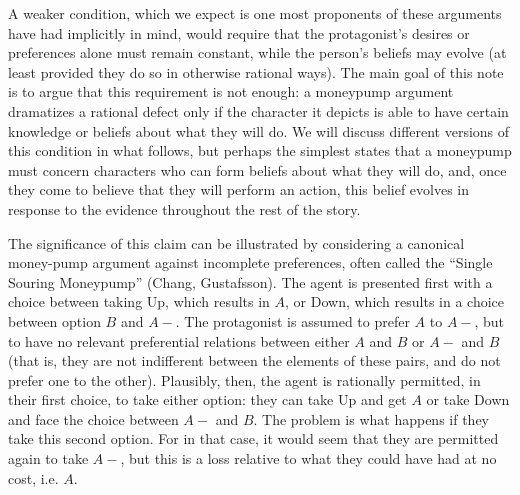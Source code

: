 \documentclass[11pt]{article}
\theoremstyle{definition}
\theoremstyle{definition}
\begin{document}
A weaker condition, which we expect is one most proponents of these arguments have had implicitly in mind, would require that the protagonist's desires or preferences alone must remain constant, while the person's beliefs may evolve (at least provided they do so in otherwise rational ways). The main goal of this note is to argue that this requirement is not enough: a moneypump argument dramatizes a rational defect only if the character it depicts is able to have certain knowledge or beliefs about what they will do. We will discuss different versions of this condition in what follows, but perhaps the simplest states that a moneypump must concern characters who can form beliefs about what they will do, and, once they come to believe that they will perform an action, this belief evolves in response to the evidence throughout the rest of the story. 

The significance of this claim can be illustrated by considering a canonical money-pump argument against incomplete preferences, often called the ``Single Souring Moneypump'' (Chang, Gustafsson). The agent is presented first with a choice between taking Up, which results in $A$, or Down, which results in a choice between option $B$ and $A-$. The protagonist is assumed to prefer $A$ to $A-$, but to have no relevant preferential relations between either $A$ and $B$ or $A-$ and $B$ (that is, they are not indifferent between the elements of these pairs, and do not prefer one to the other). Plausibly, then, the agent is rationally permitted, in their first choice, to take either option: they can take Up and get $A$ or take Down and face the choice between $A-$ and $B$. The problem is what happens if they take this second option. For in that case, it would seem that they are permitted again to take $A-$, but this is a loss relative to what they could have had at no cost, i.e. $A$.
\end{document}
